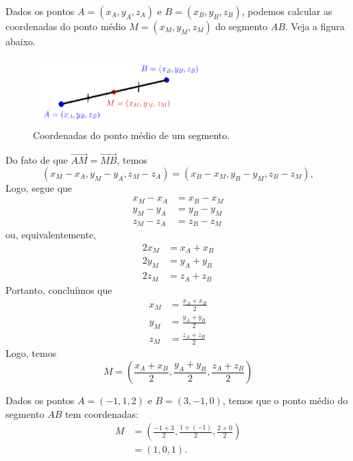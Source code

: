\begin{obs}
  Dados os pontos $A = (x_A,y_A,z_A)$ e $B = (x_B,y_B,z_B)$, podemos calcular as coordenadas do ponto médio $M = (x_M,y_M,z_M)$ do segmento $AB$. Veja a figura abaixo.

\begin{figure}[H]
  \centering
  \includegraphics[width=0.6\textwidth]{./cap_scoord/dados/fig_scoord_pm/fig}
  \caption{Coordenadas do ponto médio de um segmento.}
  \label{fig:scoord_pm}
\end{figure}  

  Do fato de que $\overrightarrow{AM} = \overrightarrow{MB}$, temos
  \begin{equation}
    (x_M-x_A,y_M-y_A,z_M-z_A)=(x_B-x_M,y_B-y_M,z_B-z_M),
  \end{equation}
  Logo, segue que
  \begin{align}
    x_M-x_A &= x_B-x_M\\
    y_M-y_A &= y_B-y_M\\
    z_M-z_A &= z_B-z_M
  \end{align}
  ou, equivalentemente,
  \begin{align}
    2x_M &= x_A+x_B\\
    2y_M &= y_A+y_B\\
    2z_M &= z_A+z_B
  \end{align}
  Portanto, concluímos que
  \begin{align}
    x_M &= \frac{x_A+x_B}{2}\\
    y_M &= \frac{y_A+y_B}{2}\\
    z_M &= \frac{z_A+z_B}{2}
  \end{align}  
  Logo, temos
  \begin{equation}
  M = \left(\frac{x_A+x_B}{2},\frac{y_A+y_B}{2},\frac{z_A+z_B}{2}\right)
\end{equation}
\end{obs}

\begin{ex}
  Dados os pontos $A = (-1,1,2)$ e $B = (3,-1,0)$, temos que o ponto médio do segmento $AB$ tem coordenadas:
  \begin{align}
    M &= \left(\frac{-1+3}{2},\frac{1+(-1)}{2},\frac{2+0}{2}\right)\\
    &= (1,0,1).
  \end{align}
\end{ex}

